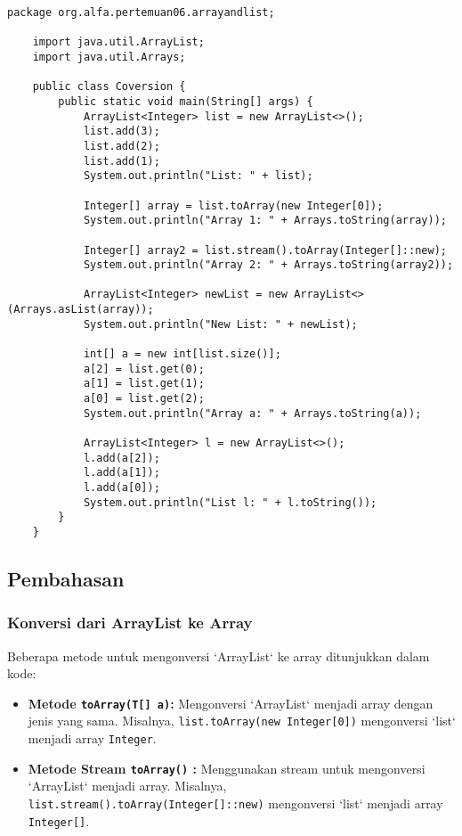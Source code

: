\begin{lstlisting}[style=JavaStyle]
	package org.alfa.pertemuan06.arrayandlist;
	
	import java.util.ArrayList;
	import java.util.Arrays;
	
	public class Coversion {
		public static void main(String[] args) {
			ArrayList<Integer> list = new ArrayList<>();
			list.add(3);
			list.add(2);
			list.add(1);
			System.out.println("List: " + list);
			
			Integer[] array = list.toArray(new Integer[0]);
			System.out.println("Array 1: " + Arrays.toString(array));
			
			Integer[] array2 = list.stream().toArray(Integer[]::new);
			System.out.println("Array 2: " + Arrays.toString(array2));
			
			ArrayList<Integer> newList = new ArrayList<>(Arrays.asList(array));
			System.out.println("New List: " + newList);
			
			int[] a = new int[list.size()];
			a[2] = list.get(0); 
			a[1] = list.get(1); 
			a[0] = list.get(2);
			System.out.println("Array a: " + Arrays.toString(a));
			
			ArrayList<Integer> l = new ArrayList<>();
			l.add(a[2]);
			l.add(a[1]);
			l.add(a[0]);
			System.out.println("List l: " + l.toString());
		}
	}
\end{lstlisting}

\subsection{Pembahasan}

\subsubsection{Konversi dari ArrayList ke Array}

Beberapa metode untuk mengonversi `ArrayList` ke array ditunjukkan dalam kode:

\begin{itemize}
	\item \textbf{Metode \texttt{toArray(T[] a)}:} Mengonversi `ArrayList` menjadi array dengan jenis yang sama. Misalnya, \texttt{list.toArray(new Integer[0])} mengonversi `list` menjadi array \texttt{Integer}.
	\item \textbf{Metode Stream \texttt{toArray()} :} Menggunakan stream untuk mengonversi `ArrayList` menjadi array. Misalnya, \texttt{list.stream().toArray(Integer[]::new)} mengonversi `list` menjadi array \texttt{Integer[]}.
\end{itemize}

